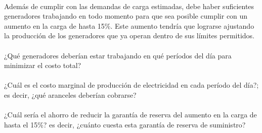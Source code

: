 \paragraph{} Además de cumplir con las demandas de carga estimadas, debe haber suficientes generadores trabajando en todo momento para que sea posible cumplir con un aumento en la carga de hasta 15\%. Este aumento tendría que lograrse ajustando la producción de los generadores que ya operan dentro de sus límites permitidos.

\paragraph{} ¿Qué generadores deberían estar trabajando en qué períodos del día para minimizar el costo total?

\paragraph{} ¿Cuál es el costo marginal de producción de electricidad en cada período del día?; es decir, ¿qué aranceles deberían cobrarse?

\paragraph{} ¿Cuál sería el ahorro de reducir la garantía de reserva del aumento en la carga de hasta el 15\%? es decir, ¿cuánto cuesta esta garantía de reserva de suministro?



